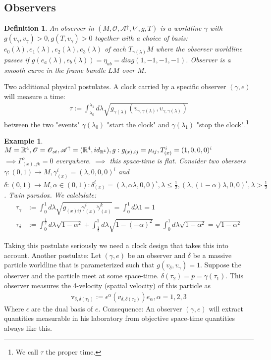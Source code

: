 \documentclass[10pt, oneside]{article}
\newcommand{\R}{\mathbb{R}}
\newtheorem{defn}{Definition}
\newtheorem{example}{Example}
\begin{document}
\subsection{Observers}
\begin{defn}
An observer in $(M,\mathcal{O},\mathcal{A}^\uparrow,\nabla,g,T)$ is a worldline $\gamma$ with $g(v_\gamma,v_\gamma)>0, g(T,v_\gamma)>0$
together with a choice of basis: $e_0 (\lambda),e_1 (\lambda),e_2 (\lambda),e_3 (\lambda)$ of each $T_{\gamma(\lambda)} M$ where the observer worldline passes if $g(e_a(\lambda),e_b(\lambda))=\eta_{ab}=diag(1,-1,-1,-1)$.
Observer is a smooth curve in the frame bundle $LM$ over $M$.
\end{defn}
Two additional physical postulates.
A clock carried by a specific observer $(\gamma,e)$ will measure a time:
\begin{align*}
\tau := \int_{\lambda_0}^{\lambda_1} d \lambda \sqrt{g_{\gamma(\lambda)}(v_{\gamma,\gamma(\lambda)},v_{\gamma,\gamma(\lambda)})}
\end{align*}
between the two "events" $\gamma(\lambda_0)$ "start the clock" and $\gamma(\lambda_1)$ "stop the clock".\footnote{We call $\tau$ the proper time. }
\begin{example}
  $M=\R^4, \mathcal{O}=\mathcal{O}_{st}, \mathcal{A}^\uparrow = (\R^4,id_{\R^{4}}), g: g_{(x),ij}=\mu_{ij},T^i_{(x)}=(1,0,0,0)^i\\$
  $\implies \Gamma_{(x),jk}^o = 0 $ everywhere. $\implies$ this space-time is flat. Consider two obersers $\gamma:(0,1) \to M, \gamma_{(x)}^i = (\lambda,0,0,0)^i$ and $\delta:(0,1) \to M, \alpha \in (0,1): \delta_{(x)}^i = (\lambda,\alpha \lambda,0,0)^i, \lambda \leq \frac{1}{2}, (\lambda,(1-\alpha)\lambda,0,0)^i, \lambda > \frac{1}{2}$. Twin paradox. We calclulate:
  \begin{align*}
  \tau_\gamma &:= \int_{0}^{1} d \lambda \sqrt{g_{(x)ij}\dot{\gamma}^i_{(x)}\dot{\gamma}_{(x)}^k}= \int_{0}^{1}d \lambda 1 = 1 \\
  \tau_\delta &:= \int_{0}^{\frac{1}{2}}d \lambda \sqrt{1 - \alpha^2}+\int_{\frac{1}{2}}^{1}d \lambda \sqrt{1- (-\alpha)^2} = \int_{0}^{1}d \lambda \sqrt{1-\alpha^2} = \sqrt{1-\alpha^2}
  \end{align*}
\end{example}
Taking this postulate seriously we need a clock design that takes this into account. Another postulate: Let $(\gamma,e)$ be an observer and $\delta$ be a massive particle worldline that is parameterized such that $g(v_\delta,v_\gamma)=1$. Suppose the observer and the particle meet at some space-time. $\delta(\tau_{2})=p=\gamma(\tau_1)$. This observer measures the 4-velocity (spatial velocity) of this particle as
\begin{align*}
  \text{v}_{\delta,\delta(\tau_{2})}:= \epsilon^\alpha(v_{\delta,\delta(\tau_{2})})e_\alpha, \alpha=1,2,3
\end{align*}
Where $\epsilon$ are the dual basis of $e$.
Consequence: An observer $(\gamma,e)$ will extract quantities measurable in his laboratory from objective space-time quantities always like this.
\end{document}
